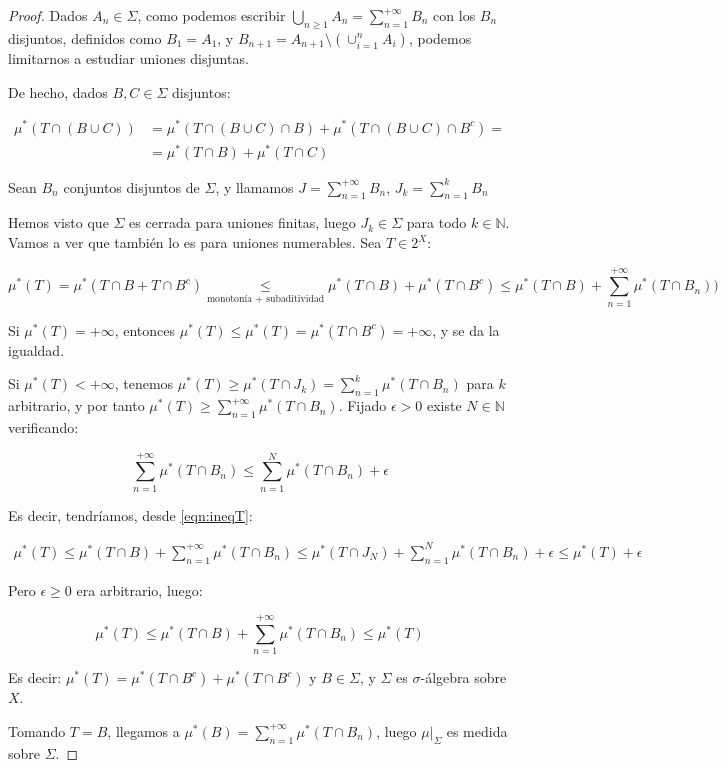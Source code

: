 \begin{proof}
 Dados $A_n \in \Sigma$, como podemos escribir $\bigcup_{n\ge 1} A_n = \sum_{n=1}^{+\infty} B_n$ con los $B_n$ 
 disjuntos, definidos como $B_1 = A_1$, y $B_{n+1} = A_{n+1} \setminus\left(\cup_{i=1}^n A_i\right)$, 
 podemos limitarnos a estudiar uniones disjuntas.
 
 De hecho, dados $B,C \in \Sigma$ disjuntos:
 
 \begin{align*}
  \mu^\ast(T \cap (B\cup C)) &= \mu^\ast(T \cap(B\cup C) \cap B) + \mu^\ast(T \cap(B\cup C) \cap B^c) =\\
                             &= \mu^\ast(T \cap B) + \mu^\ast(T \cap C)
 \end{align*}

 Sean $B_n$ conjuntos disjuntos de $\Sigma$, y llamamos $J = \sum_{n=1}^{+\infty} B_n$, $J_k = \sum_{n=1}^{k} B_n$
 
 Hemos visto que $\Sigma$ es cerrada para uniones finitas, luego $J_k \in \Sigma$ para todo $k\in \mathbb{N}$.
 Vamos a ver que también lo es para uniones numerables. Sea $T\in 2^X$:
 
 \begin{equation}
  \mu^\ast(T) = \mu^\ast(T\cap B + T\cap B^c) \underset{\textrm{monotonía + subaditividad}} \le 
  \mu^\ast(T\cap B) + \mu^\ast(T\cap B^c) \le \mu^\ast(T\cap B) + \sum_{n=1}^{+\infty}\mu^\ast(T\cap B_n))
  \label{eqn:ineqT} \tag{*}
 \end{equation}
 
 Si $\mu^\ast(T) = +\infty$, entonces $\mu^\ast(T) \le \mu^\ast(T) = \mu^\ast(T\cap B^c) = +\infty$, y se da
 la igualdad.
 
 Si $\mu^\ast(T) < +\infty$, tenemos $\mu^\ast(T) \ge \mu^\ast(T\cap J_k) = \sum_{n=1}^k \mu^\ast(T\cap B_n)$
 para $k$ arbitrario, y por tanto $\mu^\ast(T) \ge \sum_{n=1}^{+\infty} \mu^\ast(T\cap B_n)$. Fijado $\epsilon > 0$
 existe $N\in \mathbb{N}$ verificando:
 
 \[\sum_{n=1}^{+\infty} \mu^\ast(T\cap B_n) \le \sum_{n=1}^N \mu^\ast(T\cap B_n) + \epsilon\]
 
 Es decir, tendríamos, desde \eqref{eqn:ineqT}:
 
 \begin{align*}
   \mu^\ast(T) \le \mu^\ast(T\cap B) + \sum_{n=1}^{+\infty}\mu^\ast(T\cap B_n) \le 
   \mu^\ast(T\cap J_N) + \sum_{n=1}^{N}\mu^\ast(T\cap B_n) + \epsilon \le  \mu^\ast(T) + \epsilon
 \end{align*}

 Pero $\epsilon \ge 0$ era arbitrario, luego:
 
 \[\mu^\ast(T) \le \mu^\ast(T\cap B) + \sum_{n=1}^{+\infty}\mu^\ast(T\cap B_n) \le \mu^\ast(T)\]
 
 Es decir: $\mu^\ast(T) = \mu^\ast(T\cap B^c) + \mu^\ast(T\cap B^c)$ y $B\in \Sigma$, y $\Sigma$ es $\sigma$-álgebra
 sobre $X$.
 
 Tomando $T=B$, llegamos a $\mu^\ast(B) = \sum_{n=1}^{+\infty}\mu^\ast(T\cap B_n)$, luego $\mu|_{\Sigma}$ es
 medida sobre $\Sigma$.
 
\end{proof}


